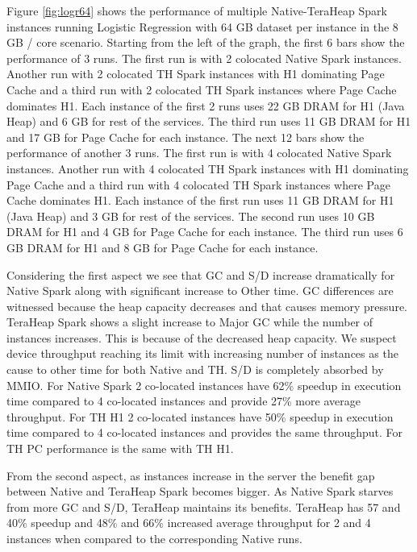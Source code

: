 Figure \ref{fig:logr64} shows the performance of multiple
Native-TeraHeap Spark instances running Logistic Regression with 64 GB
dataset per instance in the 8 GB / core scenario.
Starting from the left of the graph, the first 6 bars show the
performance of 3 runs. The first run is with 2 colocated Native Spark instances.
Another run with 2 colocated TH Spark instances with H1 dominating Page Cache
and a third run with 2 colocated TH Spark instances where Page Cache dominates H1.
Each instance of the first 2 runs uses 22 GB DRAM for H1 (Java Heap) and 6 GB for rest of the services.
The third run uses 11 GB DRAM for H1 and 17 GB for Page Cache for each instance. 
The next 12 bars show the performance of another 3 runs. The first run is with 4 colocated Native Spark instances.
Another run with 4 colocated TH Spark instances with H1 dominating Page Cache
and a third run with 4 colocated TH Spark instances where Page Cache dominates H1.
Each instance of the first run uses 11 GB DRAM for H1 (Java Heap) and 3 GB for rest of the services.
The second run uses 10 GB DRAM for H1 and 4 GB for Page Cache for each instance.
The third run uses 6 GB DRAM for H1 and 8 GB for Page Cache for each instance.

Considering the first aspect we see that GC and S/D increase dramatically for Native Spark along with significant increase to Other time. GC differences are witnessed because the heap capacity decreases and that causes memory pressure. TeraHeap Spark shows a slight increase to Major GC while the number of instances increases. This is because of the decreased heap capacity. We suspect device throughput reaching its limit with increasing number of instances as the cause to other time for both Native and TH. S/D is completely absorbed by MMIO. For Native Spark 2 co-located instances have 62\% speedup in execution time compared to 4 co-located instances and provide 27\% more average throughput. For TH H1 2 co-located instances have 50\% speedup in execution time compared to 4 co-located instances and provides the same throughput. For TH PC performance is the same with TH H1. 

From the second aspect, as instances increase in the server the benefit gap between Native and TeraHeap Spark becomes bigger. As Native Spark starves from more GC and S/D, TeraHeap maintains its benefits. TeraHeap has 57 and 40\% speedup and 48\% and 66\% increased average throughput for 2 and 4 instances when compared to the corresponding Native runs.

